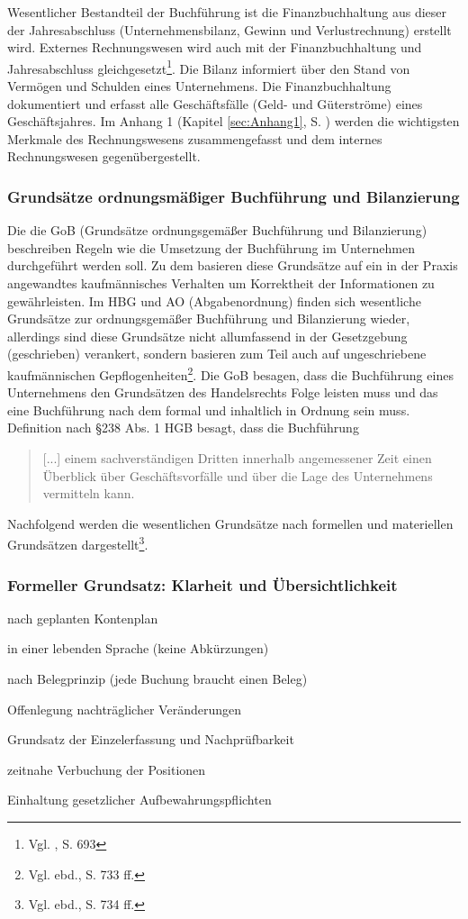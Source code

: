 Wesentlicher Bestandteil der Buchführung ist die Finanzbuchhaltung aus dieser der Jahresabschluss (Unternehmensbilanz,  Gewinn und Verlustrechnung) erstellt wird. Externes Rechnungswesen wird auch mit der Finanzbuchhaltung und Jahresabschluss gleichgesetzt\footnote{Vgl. \cite{Wohe2000}, S. 693}. Die Bilanz informiert über den Stand von Vermögen und Schulden eines Unternehmens. Die Finanzbuchhaltung dokumentiert
und erfasst alle Geschäftsfälle (Geld- und Güterströme) eines Geschäftsjahres.
Im Anhang 1 (Kapitel \ref{sec:Anhang1}, S. \pageref{sec:Anhang1}) werden die wichtigsten Merkmale des Rechnungswesens zusammengefasst und dem internes Rechnungswesen gegenübergestellt.

\subsubsection{Grundsätze ordnungsmäßiger Buchführung und Bilanzierung}
Die die GoB (Grundsätze ordnungsgemäßer Buchführung und Bilanzierung) beschreiben Regeln wie die Umsetzung der Buchführung im Unternehmen durchgeführt werden soll. Zu dem basieren diese Grundsätze auf ein in der Praxis angewandtes kaufmännisches Verhalten um Korrektheit der Informationen zu gewährleisten. Im HBG und AO (Abgabenordnung) finden sich wesentliche Grundsätze zur ordnungsgemäßer Buchführung und Bilanzierung wieder, allerdings sind diese Grundsätze nicht allumfassend in der Gesetzgebung (geschrieben) verankert, sondern basieren zum Teil auch auf ungeschriebene kaufmännischen Gepflogenheiten\footnote{Vgl. ebd., S. 733 ff.}. Die GoB besagen, dass die Buchführung eines Unternehmens den Grundsätzen des Handelsrechts Folge leisten muss und das eine Buchführung nach dem formal und inhaltlich in Ordnung sein muss. 
Definition nach §238 Abs. 1 HGB besagt, dass die Buchführung \begin{quote}[...] einem sachverständigen Dritten innerhalb angemessener Zeit einen Überblick über Geschäftsvorfälle und über die Lage des Unternehmens vermitteln kann.\end{quote}

Nachfolgend werden die wesentlichen Grundsätze nach formellen und materiellen Grundsätzen dargestellt\footnote{Vgl. ebd., S. 734 ff.}.
\subsubsection*{Formeller Grundsatz: Klarheit und Übersichtlichkeit}
\begin{compactitem} 
\item  nach geplanten Kontenplan
\item  in einer lebenden Sprache (keine Abkürzungen)
\item  nach Belegprinzip (jede Buchung braucht einen Beleg)
\item  Offenlegung nachträglicher Veränderungen
\item  Grundsatz der Einzelerfassung und Nachprüfbarkeit
\item  zeitnahe Verbuchung der Positionen
\item  Einhaltung gesetzlicher Aufbewahrungspflichten
\end{compactitem}
